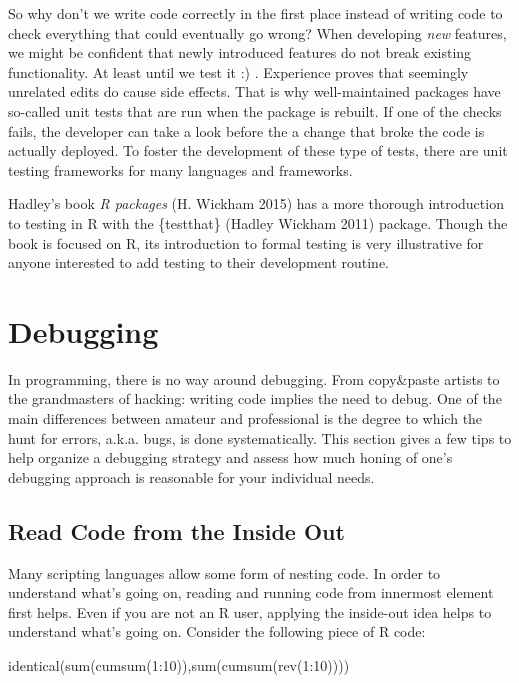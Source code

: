 \documentclass[
  12pt,
  letterpaper,
]{krantz}
\newenvironment{Shaded}{\begin{snugshade}}{\end{snugshade}}
\newcommand{\DecValTok}[1]{\textcolor[rgb]{0.68,0.00,0.00}{#1}}
\newcommand{\FunctionTok}[1]{\textcolor[rgb]{0.28,0.35,0.67}{#1}}
\newcommand{\NormalTok}[1]{\textcolor[rgb]{0.00,0.23,0.31}{#1}}
\newcommand{\SpecialCharTok}[1]{\textcolor[rgb]{0.37,0.37,0.37}{#1}}
\begin{document}
So why don't we write code correctly in the first place instead of
writing code to check everything that could eventually go wrong? When
developing \emph{new} features, we might be confident that newly
introduced features do not break existing functionality. At least until
we test it :) . Experience proves that seemingly unrelated edits do
cause side effects. That is why well-maintained packages have so-called
unit tests that are run when the package is rebuilt. If one of the
checks fails, the developer can take a look before the a change that
broke the code is actually deployed. To foster the development of these
type of tests, there are unit testing frameworks for many languages and
frameworks.

Hadley's book \emph{R packages} (H. Wickham 2015) has a more thorough
introduction to testing in R with the \{testthat\} (Hadley Wickham 2011)
package. Though the book is focused on R, its introduction to formal
testing is very illustrative for anyone interested to add testing to
their development routine.

\hypertarget{debugging}{%
\section{Debugging}\label{debugging}}

In programming, there is no way around debugging. From copy\&paste
artists to the grandmasters of hacking: writing code implies the need to
debug. One of the main differences between amateur and professional is
the degree to which the hunt for errors, a.k.a. bugs, is done
systematically. This section gives a few tips to help organize a
debugging strategy and assess how much honing of one's debugging
approach is reasonable for your individual needs.

\hypertarget{read-code-from-the-inside-out}{%
\subsection{Read Code from the Inside
Out}\label{read-code-from-the-inside-out}}

Many scripting languages allow some form of nesting code. In order to
understand what's going on, reading and running code from innermost
element first helps. Even if you are not an R user, applying the
inside-out idea helps to understand what's going on. Consider the
following piece of R code:

\begin{Shaded}
\begin{Highlighting}[]
\FunctionTok{identical}\NormalTok{(}\FunctionTok{sum}\NormalTok{(}\FunctionTok{cumsum}\NormalTok{(}\DecValTok{1}\SpecialCharTok{:}\DecValTok{10}\NormalTok{)),}\FunctionTok{sum}\NormalTok{(}\FunctionTok{cumsum}\NormalTok{(}\FunctionTok{rev}\NormalTok{(}\DecValTok{1}\SpecialCharTok{:}\DecValTok{10}\NormalTok{))))}
\end{Highlighting}
\end{Shaded}
\end{document}
